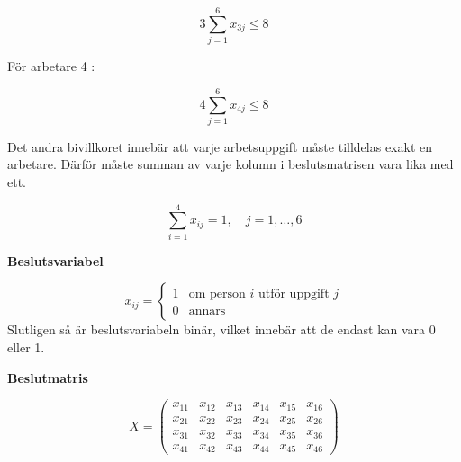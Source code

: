 \documentclass[11pt]{article}
\begin{document}
\[
3\sum_{j=1}^{6}x_{3j}\leq 8 \tag{10}\]

För arbetare 4 :

\[
4\sum_{j=1}^{6}x_{4j}\leq 8 \tag{11}\]

Det andra bivillkoret innebär att varje arbetsuppgift måste tilldelas
exakt en arbetare. Därför måste summan av varje kolumn i beslutsmatrisen
vara lika med ett.

\[
\sum_{i=1}^{4}x_{ij}=1,
\quad j=1,\ldots,6 \tag{12}\]

\textbf{Beslutsvariabel}

\[x_{ij} = \begin{cases} 1 & \text{om person } i \text{ utför uppgift } j \\ 0 & \text{annars} \end{cases} \tag{13}\]
Slutligen så är beslutsvariabeln binär, vilket innebär att de endast kan
vara 0 eller 1.

\textbf{Beslutmatris}

\[
X =
\begin{pmatrix}
x_{11} & x_{12} & x_{13} & x_{14} & x_{15} & x_{16} \\
x_{21} & x_{22} & x_{23} & x_{24} & x_{25} & x_{26} \\
x_{31} & x_{32} & x_{33} & x_{34} & x_{35} & x_{36} \\
x_{41} & x_{42} & x_{43} & x_{44} & x_{45} & x_{46}
\end{pmatrix} \tag{14}\]
\end{document}
